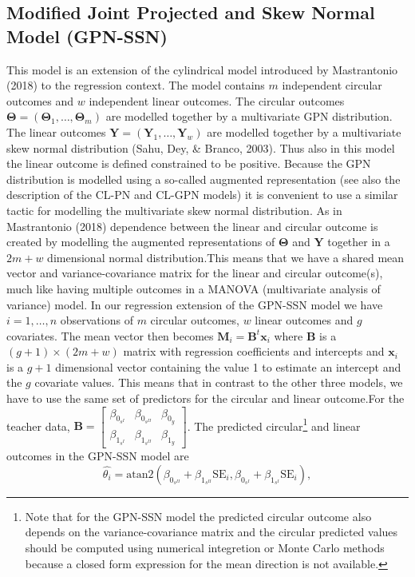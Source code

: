 \documentclass[man]{apa6}
\let\rmarkdownfootnote\footnote%
\def\footnote{\protect\rmarkdownfootnote}
\theoremstyle{definition}
\theoremstyle{definition}
\theoremstyle{definition}
\theoremstyle{remark}
\begin{document}
\subsection{Modified Joint Projected and Skew Normal Model (GPN-SSN)}\label{CL-GPN_multivariate}

This model is an extension of the cylindrical model introduced by
Mastrantonio (2018) to the regression context. The model contains \(m\)
independent circular outcomes and \(w\) independent linear outcomes. The
circular outcomes
\(\boldsymbol{\Theta} = (\boldsymbol{\Theta}_1, \dots,  \boldsymbol{\Theta}_m)\)
are modelled together by a multivariate GPN distribution. The linear
outcomes
\(\boldsymbol{Y} = (\boldsymbol{Y}_1, \dots,  \boldsymbol{Y}_w)\) are
modelled together by a multivariate skew normal distribution (Sahu, Dey,
\& Branco, 2003). Thus also in this model the linear outcome is defined
constrained to be positive. Because the GPN distribution is modelled
using a so-called augmented representation (see also the description of
the CL-PN and CL-GPN models) it is convenient to use a similar tactic
for modelling the multivariate skew normal distribution. As in
Mastrantonio (2018) dependence between the linear and circular outcome
is created by modelling the augmented representations of
\(\boldsymbol{\Theta}\) and \(\boldsymbol{Y}\) together in a \(2m + w\)
dimensional normal distribution.\newline \indent This means that we have
a shared mean vector and variance-covariance matrix for the linear and
circular outcome(s), much like having multiple outcomes in a MANOVA
(multivariate analysis of variance) model. In our regression extension
of the GPN-SSN model we have \(i = 1, \dots, n\) observations of \(m\)
circular outcomes, \(w\) linear outcomes and \(g\) covariates. The mean
vector then becomes
\(\boldsymbol{M}_i = \boldsymbol{B}^t\boldsymbol{x}_i\) where
\(\boldsymbol{B}\) is a \((g + 1) \times (2m + w)\) matrix with
regression coefficients and intercepts and \(\boldsymbol{x}_i\) is a
\(g + 1\) dimensional vector containing the value 1 to estimate an
intercept and the \(g\) covariate values. This means that in contrast to
the other three models, we have to use the same set of predictors for
the circular and linear outcome.\newline \indent For the teacher data,
\(\boldsymbol{B} = \begin{bmatrix} \beta_{0_{s^{I}}} & \beta_{0_{s^{II}}} & \beta_{0_{y}}\\ \beta_{1_{s^{I}}} & \beta_{1_{s^{II}}} & \beta_{1_{y}} \end{bmatrix}\).
The predicted
circular\footnote{Note that for the  GPN-SSN model the predicted circular outcome also depends on the variance-covariance matrix and the circular predicted values should be computed using numerical integretion or Monte Carlo methods because a closed form expression for the mean direction is not available.}
and linear outcomes in the GPN-SSN model are
\[\hat{\theta_i} = \mbox{atan2}(\beta_{0_{s^{II}}} +
\beta_{1_{s^{II}}}\text{SE}_i,\beta_{0_{s^{I}}} +
\beta_{1_{s^{I}}}\text{SE}_i),\]
\end{document}
